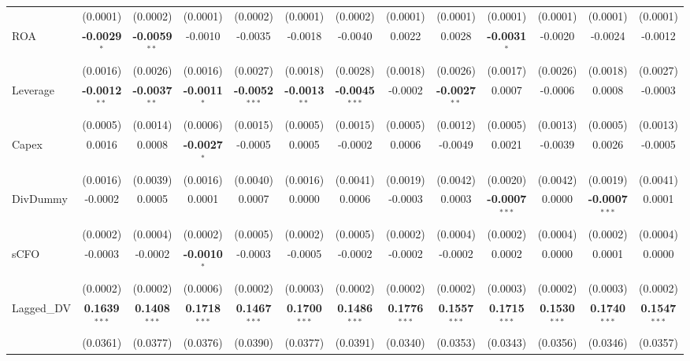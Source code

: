 \documentclass[11pt,a4paper]{article}
\begin{document}
\begin{table}[htbp]
\begin{tabular}{lcccccccccccc}
 & (0.0001) & (0.0002) & (0.0001) & (0.0002) & (0.0001) & (0.0002) & (0.0001) & (0.0001) & (0.0001) & (0.0001) & (0.0001) & (0.0001) \\
ROA & \textbf{-0.0029}$^{*}$ & \textbf{-0.0059}$^{**}$ & -0.0010 & -0.0035 & -0.0018 & -0.0040 & 0.0022 & 0.0028 & \textbf{-0.0031}$^{*}$ & -0.0020 & -0.0024 & -0.0012 \\
 & (0.0016) & (0.0026) & (0.0016) & (0.0027) & (0.0018) & (0.0028) & (0.0018) & (0.0026) & (0.0017) & (0.0026) & (0.0018) & (0.0027) \\
Leverage & \textbf{-0.0012}$^{**}$ & \textbf{-0.0037}$^{**}$ & \textbf{-0.0011}$^{*}$ & \textbf{-0.0052}$^{***}$ & \textbf{-0.0013}$^{**}$ & \textbf{-0.0045}$^{***}$ & -0.0002 & \textbf{-0.0027}$^{**}$ & 0.0007 & -0.0006 & 0.0008 & -0.0003 \\
 & (0.0005) & (0.0014) & (0.0006) & (0.0015) & (0.0005) & (0.0015) & (0.0005) & (0.0012) & (0.0005) & (0.0013) & (0.0005) & (0.0013) \\
Capex & 0.0016 & 0.0008 & \textbf{-0.0027}$^{*}$ & -0.0005 & 0.0005 & -0.0002 & 0.0006 & -0.0049 & 0.0021 & -0.0039 & 0.0026 & -0.0005 \\
 & (0.0016) & (0.0039) & (0.0016) & (0.0040) & (0.0016) & (0.0041) & (0.0019) & (0.0042) & (0.0020) & (0.0042) & (0.0019) & (0.0041) \\
DivDummy & -0.0002 & 0.0005 & 0.0001 & 0.0007 & 0.0000 & 0.0006 & -0.0003 & 0.0003 & \textbf{-0.0007}$^{***}$ & 0.0000 & \textbf{-0.0007}$^{***}$ & 0.0001 \\
 & (0.0002) & (0.0004) & (0.0002) & (0.0005) & (0.0002) & (0.0005) & (0.0002) & (0.0004) & (0.0002) & (0.0004) & (0.0002) & (0.0004) \\
sCFO & -0.0003 & -0.0002 & \textbf{-0.0010}$^{*}$ & -0.0003 & -0.0005 & -0.0002 & -0.0002 & -0.0002 & 0.0002 & 0.0000 & 0.0001 & 0.0000 \\
 & (0.0002) & (0.0002) & (0.0006) & (0.0002) & (0.0003) & (0.0002) & (0.0002) & (0.0002) & (0.0003) & (0.0002) & (0.0003) & (0.0002) \\
Lagged\_DV & \textbf{0.1639}$^{***}$ & \textbf{0.1408}$^{***}$ & \textbf{0.1718}$^{***}$ & \textbf{0.1467}$^{***}$ & \textbf{0.1700}$^{***}$ & \textbf{0.1486}$^{***}$ & \textbf{0.1776}$^{***}$ & \textbf{0.1557}$^{***}$ & \textbf{0.1715}$^{***}$ & \textbf{0.1530}$^{***}$ & \textbf{0.1740}$^{***}$ & \textbf{0.1547}$^{***}$ \\
 & (0.0361) & (0.0377) & (0.0376) & (0.0390) & (0.0377) & (0.0391) & (0.0340) & (0.0353) & (0.0343) & (0.0356) & (0.0346) & (0.0357) \\

\end{tabular}
\end{table}
\end{document}
